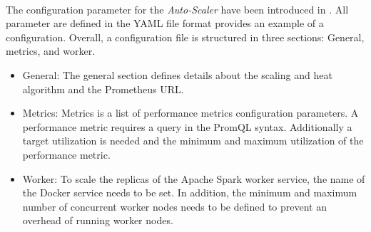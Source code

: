 \paragraph{}The configuration parameter for the \textit{Auto-Scaler} have been introduced in .
All parameter are defined in the YAML file format
 provides an example of a configuration.
Overall, a configuration file is structured in three sections: General, metrics, and worker.
\begin{itemize}
\item General:
The general section defines details about the scaling and heat algorithm and the Prometheus URL.

\item Metrics:
Metrics is a list of performance metrics configuration parameters. A performance metric requires a query in the PromQL syntax. Additionally a target utilization is needed and the minimum and maximum utilization of the performance metric.

\item Worker:
To scale the replicas of the Apache Spark worker service, the name of the Docker service needs to be set. In addition, the minimum and maximum number of concurrent worker nodes needs to be defined to prevent an overhead of running worker nodes.
\end{itemize}

